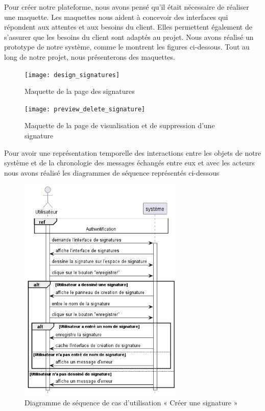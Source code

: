 Pour créer notre plateforme, nous avons pensé qu'il était nécessaire de réaliser une maquette. Les maquettes nous aident à concevoir des interfaces qui répondent aux attentes et aux besoins du client. Elles permettent également de s'assurer que les besoins du client sont adaptés au projet. Nous avons réalisé un prototype de notre système, comme le montrent les figures ci-dessous. Tout au long de notre projet, nous présenterons des maquettes.

\begin{figure}[H]
  \centering
  \texttt{[image: design\_signatures]}
  \caption{Maquette de la page des signatures}
  \label{fig:design_signatures}
\end{figure}

\begin{figure}[H]
  \centering
  \texttt{[image: preview\_delete\_signature]}
  \caption{Maquette de la page de visualisation et de suppression d'une signature}
  \label{fig:design_preview_delete_signature}
\end{figure}

Pour avoir une représentation temporelle des interactions entre les objets de notre système et de la chronologie des messages échangés entre eux et avec les acteurs nous avons réalisé les diagrammes de séquence représentés ci-dessous

\begin{figure}[H]
  \centering
  \includegraphics[width=0.7\textwidth]{out/diagrams/signatures/create/create_signature}
  \caption{Diagramme de séquence de cas d'utilisation « Créer une signature  »}
  \label{fig:sequence_create_signature}
\end{figure}

